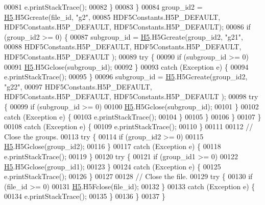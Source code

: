 \begin{DoxyCode}
00081                         e.printStackTrace();
00082                     \}
00083                 \}
00084                 group\_id2 = \hyperlink{namespace_h5}{H5}.H5Gcreate(file\_id, \textcolor{stringliteral}{"g2"},
00085                         HDF5Constants.H5P\_DEFAULT, HDF5Constants.H5P\_DEFAULT, HDF5Constants.H5P\_DEFAULT);
00086                 \textcolor{keywordflow}{if} (group\_id2 >= 0) \{
00087                     subgroup\_id = \hyperlink{namespace_h5}{H5}.H5Gcreate(group\_id2, \textcolor{stringliteral}{"g21"},
00088                             HDF5Constants.H5P\_DEFAULT, HDF5Constants.H5P\_DEFAULT, HDF5Constants.H5P\_DEFAULT
      );
00089                     \textcolor{keywordflow}{try} \{
00090                         \textcolor{keywordflow}{if} (subgroup\_id >= 0)
00091                             \hyperlink{namespace_h5}{H5}.H5Gclose(subgroup\_id);
00092                     \}
00093                     \textcolor{keywordflow}{catch} (Exception e) \{
00094                         e.printStackTrace();
00095                     \}
00096                     subgroup\_id = \hyperlink{namespace_h5}{H5}.H5Gcreate(group\_id2, \textcolor{stringliteral}{"g22"},
00097                             HDF5Constants.H5P\_DEFAULT, HDF5Constants.H5P\_DEFAULT, HDF5Constants.H5P\_DEFAULT
      );
00098                     \textcolor{keywordflow}{try} \{
00099                         \textcolor{keywordflow}{if} (subgroup\_id >= 0)
00100                             \hyperlink{namespace_h5}{H5}.H5Gclose(subgroup\_id);
00101                     \}
00102                     \textcolor{keywordflow}{catch} (Exception e) \{
00103                         e.printStackTrace();
00104                     \}
00105                 \}
00106             \}
00107         \}
00108         \textcolor{keywordflow}{catch} (Exception e) \{
00109             e.printStackTrace();
00110         \}
00111 
00112         \textcolor{comment}{// Close the groups.}
00113         \textcolor{keywordflow}{try} \{
00114             \textcolor{keywordflow}{if} (group\_id2 >= 0)
00115                 \hyperlink{namespace_h5}{H5}.H5Gclose(group\_id2);
00116         \}
00117         \textcolor{keywordflow}{catch} (Exception e) \{
00118             e.printStackTrace();
00119         \}
00120         \textcolor{keywordflow}{try} \{
00121             \textcolor{keywordflow}{if} (group\_id1 >= 0)
00122                 \hyperlink{namespace_h5}{H5}.H5Gclose(group\_id1);
00123         \}
00124         \textcolor{keywordflow}{catch} (Exception e) \{
00125             e.printStackTrace();
00126         \}
00127 
00128         \textcolor{comment}{// Close the file.}
00129         \textcolor{keywordflow}{try} \{
00130             \textcolor{keywordflow}{if} (file\_id >= 0)
00131                 \hyperlink{namespace_h5}{H5}.H5Fclose(file\_id);
00132         \}
00133         \textcolor{keywordflow}{catch} (Exception e) \{
00134             e.printStackTrace();
00135         \}
00136     \}
00137 \}
\end{DoxyCode}
